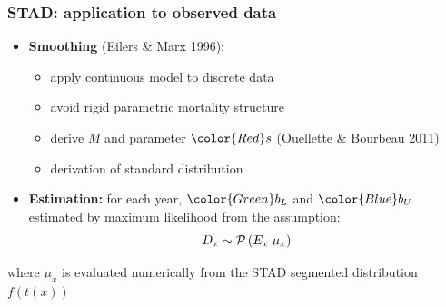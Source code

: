 \documentclass[12pt, xcolor=table]{beamer}  %
\begin{document}
\begin{frame}[noframenumbering]\frametitle{STAD: application to observed data}
	\vspace{0.4cm}
	\begin{itemize}
		
		
		\item \textbf{Smoothing} {\scriptsize (Eilers \& Marx 1996)}:
		\begin{itemize}
			\item apply continuous model to discrete data		
			\item avoid rigid parametric mortality structure
			\item derive $M$ and parameter ${\color{Red}s}$ {\scriptsize (Ouellette \& Bourbeau 2011)}
			\item derivation of standard distribution %
		\end{itemize}
		\bigskip
		
		\item \textbf{Estimation:} for each year, ${\color{Green} b_{L}}$ and ${\color{Blue} b_{U}}$ estimated by maximum likelihood from the assumption: 
		\begin{equation}\label{Eq:Poisson}
		D_{x} \sim \mathcal{P} \, (E_{x} \; \mu_{x}) \notag 
		\end{equation}
	\end{itemize}	
	
	\vspace{0.05cm}
	\begin{center}
		{\scriptsize where $\mu_{x}$ is evaluated numerically from the STAD segmented distribution $f(t(x))$}
		
	\end{center}		
		
\end{frame}
\end{document}
